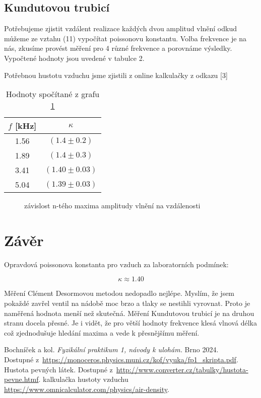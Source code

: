 \documentclass[a4paper,11pt]{article}
\begin{document}
\subsection{Kundutovou trubicí}

Potřebujeme zjistit vzdálent realizace každých dvou amplitud vlnění odkud můžeme ze vztahu (11) vypočítat 
poissonovu konstantu.
Volba frekvence je na nás, zkusíme provést měření pro 4 různé frekvence a porovnáme výsledky. 
Vypočtené hodnoty jsou uvedené v tabulce 2.

Potřebnou hustotu vzduchu jsme zjistili z online kalkulačky z odkazu [3]

\begin{table}[ht]
  \centering
  \begin{tabular}{c | c}
    $f$ [kHz] & $\kappa$ \\ \hline
    1.56 & $(1.4 \pm 0.2)$ \\
    1.89 & $(1.4 \pm 0.3 )$\\
    3.41 & $(1.40 \pm 0.03)$ \\
    5.04 & $(1.39 \pm 0.03)$ \\
  \end{tabular}
  \caption{Hodnoty spočítané z grafu \ref{fig:4}}
\end{table}

\newpage

\begin{figure}[htpb]
  \centering
  
  \caption{závislost n-tého maxima amplitudy vlnění na vzdálenosti}
  \label{fig:4}
\end{figure}

\section{Závěr}

Opravdová poissonova konstanta pro vzduch za laboratorních podmínek:

\begin{equation}
\kappa \approx 1.40
\end{equation}

Měření Clément Desormovou metodou nedopadlo nejlépe. Myslím, že jsem pokaždé zavřel ventil na nádobě moc brzo a tlaky se nestihli vyrovnat.
Proto je naměřená hodnota menší než skutečná. Měření Kundutovou trubicí je na druhou stranu docela přesné. 
Je i vidět, že pro větší hodnoty frekvence klesá vlnová délka což zjednodušuje hledání maxima a vede k přesnějšímu měření.



\begin{thebibliography}{0}
 Bochníček a kol. \textit{Fyzikální praktikum 1, návody k ulohám.} Brno 2024.\\ Dostupné z~\url{https://monoceros.physics.muni.cz/kof/vyuka/fp1_skripta.pdf}.   
 Hustota pevných látek. Dostupné z~\url{http://www.converter.cz/tabulky/hustota-pevne.htmf}.   
 kalkulačka hustoty vzduchu \url{https://www.omnicalculator.com/physics/air-density}.
\end{thebibliography}
\end{document}
